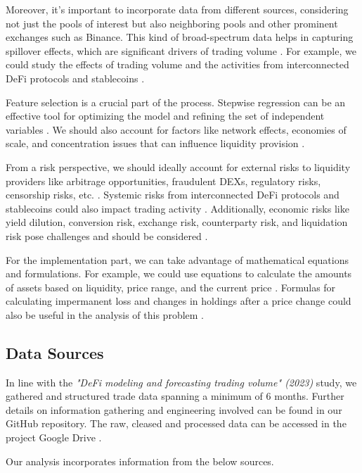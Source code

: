 \documentclass{article}
\begin{document}
Moreover, it's important to incorporate data from different sources, considering not just the pools of interest but also neighboring pools and other prominent exchanges such as Binance. This kind of broad-spectrum data helps in capturing spillover effects, which are significant drivers of trading volume \cite{Miori2023}. For example, we could study the effects of trading volume and the activities from interconnected DeFi protocols and stablecoins \cite{Miori2022}.

Feature selection is a crucial part of the process. Stepwise regression can be an effective tool for optimizing the model and refining the set of independent variables \cite{Miori2023}. We should also account for factors like network effects, economies of scale, and concentration issues that can influence liquidity provision \cite{Makarov2022, Miori2022}.

From a risk perspective, we should ideally account for external risks to liquidity providers like arbitrage opportunities, fraudulent DEXs, regulatory risks, censorship risks, etc. \cite{Aigner2021}. Systemic risks from interconnected DeFi protocols and stablecoins could also impact trading activity \cite{Makarov2022}. Additionally, economic risks like yield dilution, conversion risk, exchange risk, counterparty risk, and liquidation risk pose challenges and should be considered \cite{Xu2023}.

For the implementation part, we can take advantage of mathematical equations and formulations. For example, we could use equations to calculate the amounts of assets based on liquidity, price range, and the current price \cite{Elsts2021}. Formulas for calculating impermanent loss and changes in holdings after a price change could also be useful in the analysis of this problem \cite{Elsts2021, Aigner2021, Heimbach2022}.

\subsection{\textbf{Data Sources}}

In line with the \textit{"DeFi modeling and forecasting trading volume" (2023)} study\cite{Miori2023}, we gathered and structured trade data spanning a minimum of 6 months. Further details on information gathering and engineering involved can be found in our GitHub repository\cite{TeamRepo}. The raw, cleased and processed data can be accessed in the project Google Drive \cite{ProjectData}.

Our analysis incorporates information from the below sources.
\end{document}

